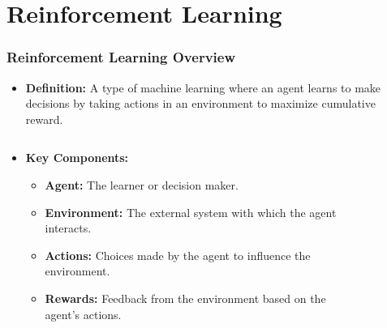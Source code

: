 \section{Reinforcement Learning}
\begin{frame}
    \frametitle{Reinforcement Learning Overview}
    \setlength{\itemsep}{6pt}
    \begin{itemize}
        \item \textbf{Definition:} A type of machine learning where an agent learns to make decisions by taking actions in an environment to maximize cumulative reward.
    \end{itemize}
    \begin{columns}[T]
        \begin{column}{0.5\textwidth}
            \begin{itemize}
                \item \textbf{Key Components:}
                \begin{itemize}
                    \item \textbf{Agent:} The learner or decision maker.
                    \item \textbf{Environment:} The external system with which the agent interacts.
                    \item \textbf{Actions:} Choices made by the agent to influence the environment.
                    \item \textbf{Rewards:} Feedback from the environment based on the agent's actions.
                \end{itemize}
            \end{itemize}
        \end{column}
        \hspace{-1cm}
        \begin{column}{0.5\textwidth}
            \begin{figure}
                \centering
\end{figure}
\end{column}
\end{columns}
\end{frame}
